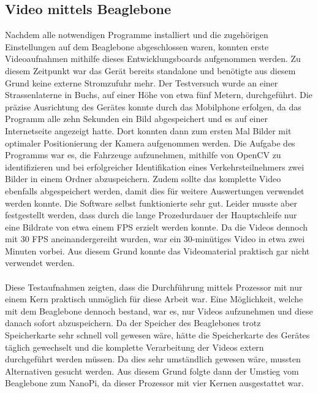 \subsection{Video mittels Beaglebone}
Nachdem alle notwendigen Programme installiert und die zugehörigen Einstellungen auf dem Beaglebone abgeschlossen waren, konnten erste Videoaufnahmen mithilfe dieses Entwicklungsboards aufgenommen werden. Zu diesem Zeitpunkt war das Gerät bereits standalone und benötigte aus diesem Grund keine externe Stromzufuhr mehr. Der Testversuch wurde an einer Strassenlaterne in Buchs, auf einer Höhe von etwa fünf Metern, durchgeführt. Die präzise Ausrichtung des Gerätes konnte durch das Mobilphone erfolgen, da das Programm alle zehn Sekunden ein Bild abgespeichert und es auf einer Internetseite angezeigt hatte. Dort konnten dann zum ersten Mal Bilder mit optimaler Positionierung der Kamera aufgenommen werden. Die Aufgabe des Programms war es, die Fahrzeuge aufzunehmen, mithilfe von OpenCV zu identifizieren und bei erfolgreicher Identifikation eines Verkehrsteilnehmers zwei Bilder in einem Ordner abzuspeichern. Zudem sollte das komplette Video ebenfalls abgespeichert werden, damit dies für weitere Auswertungen verwendet werden konnte. Die Software selbst funktionierte sehr gut. Leider musste aber festgestellt werden, dass durch die lange Prozedurdauer der Hauptschleife nur eine Bildrate von etwa einem FPS erzielt werden konnte. Da die Videos dennoch mit 30 FPS aneinandergereiht wurden, war ein 30-minütiges Video in etwa zwei Minuten vorbei. Aus diesem Grund konnte das Videomaterial praktisch gar nicht verwendet werden.\\\\
Diese Testaufnahmen zeigten, dass die Durchführung mittels Prozessor mit nur einem Kern praktisch unmöglich für diese Arbeit war. Eine Möglichkeit, welche mit dem Beaglebone dennoch bestand, war es, nur Videos aufzunehmen und diese danach sofort abzuspeichern. Da der Speicher des Beaglebones trotz Speicherkarte sehr schnell voll gewesen wäre, hätte die Speicherkarte des Gerätes täglich gewechselt und die komplette Verarbeitung der Videos extern durchgeführt werden müssen. Da dies sehr umständlich gewesen wäre, mussten Alternativen gesucht werden. Aus diesem Grund folgte dann der Umstieg vom Beaglebone zum NanoPi, da dieser Prozessor mit vier Kernen ausgestattet war.